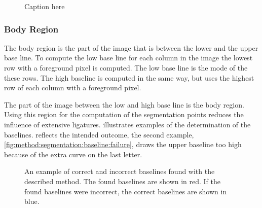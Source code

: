 \begin{figure}
	\centering
	\caption{Caption here}
	\label{fig:method:segmentation:tree}
\end{figure}

\subsubsection{Body Region}
\label{sss:method:segmentaton:bodyregion}
	The body region is the part of the image that is between the lower and the upper base line. To compute the low base line for each column in the image the lowest row with a foreground pixel is computed. The low base line is the mode of the these rows. The high baseline is computed in the same way, but uses the highest row of each column with a foreground pixel. 

	The part of the image between the low and high base line is the body region. Using this region for the computation of the segmentation points reduces the influence of extensive ligatures.  illustrates examples of the determination of the baselines.  reflects the intended outcome, the second example, \cref{fig:method:segmentation:baseline:failure}, draws the upper baseline too high because of the extra curve on the last letter.

	\begin{figure}
		\centering
		\hspace{0.05\columnwidth}
		\caption{An example of \protect{} correct and \protect{} incorrect baselines found with the described method. The found baselines are shown in red. If the found baselines were incorrect, the correct baselines are shown in blue.}
		\label{fig:method:segmentation:baseline}
	\end{figure}


